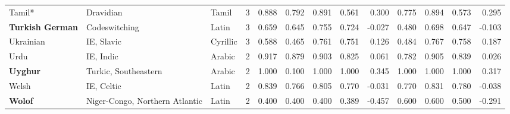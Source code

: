 \begin{tabular}{lllrrrrrrrrrr}
                         Tamil* &                       Dravidian &      Tamil &         3 &                       0.888 &                         0.792 &         0.891 &                  0.561 &            0.300 &                         0.775 &         0.894 &                  0.573 &            0.295 \\
        \textbf{Turkish German} &                   Codeswitching &      Latin &         3 &                       0.659 &                         0.645 &         0.755 &                  0.724 &           -0.027 &                         0.480 &         0.698 &                  0.647 &           -0.103 \\
                      Ukrainian &                      IE, Slavic &   Cyrillic &         3 &                       0.588 &                         0.465 &         0.761 &                  0.751 &            0.126 &                         0.484 &         0.767 &                  0.758 &            0.187 \\
                           Urdu &                       IE, Indic &     Arabic &         2 &                       0.917 &                         0.879 &         0.903 &                  0.825 &            0.061 &                         0.782 &         0.905 &                  0.839 &            0.026 \\
                \textbf{Uyghur} &            Turkic, Southeastern &     Arabic &         2 &                       1.000 &                         0.100 &         1.000 &                  1.000 &            0.345 &                         1.000 &         1.000 &                  1.000 &            0.317 \\
                          Welsh &                      IE, Celtic &      Latin &         2 &                       0.839 &                         0.766 &         0.805 &                  0.770 &           -0.031 &                         0.770 &         0.831 &                  0.780 &           -0.038 \\
                 \textbf{Wolof} &  Niger-Congo, Northern Atlantic &      Latin &         2 &                       0.400 &                         0.400 &         0.400 &                  0.389 &           -0.457 &                         0.600 &         0.600 &                  0.500 &           -0.291 \\
\bottomrule
\end{tabular}
